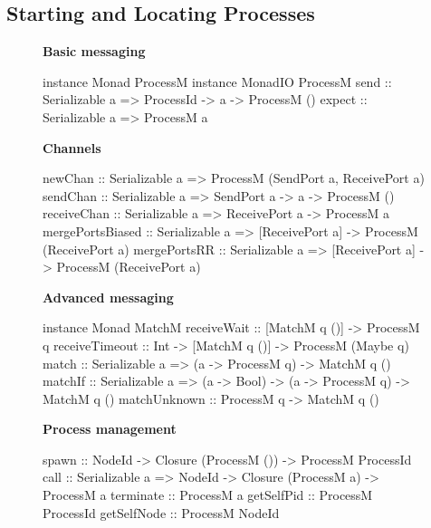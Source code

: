 \documentclass{sigplanconf}
\begin{document}

\subsection{Starting and Locating Processes}

\begin{figure}[t!]
\small
\renewcommand{\baselinestretch}{0.80}
\newcommand{\apisection}[1]{\textbf{#1} \vspace{-0.5ex}}
\apisection{Basic messaging}
\begin{code}
instance Monad ProcessM
instance MonadIO ProcessM
send   :: Serializable a => ProcessId -> a -> ProcessM ()
expect :: Serializable a => ProcessM a
\end{code}
 \apisection{Channels}
\begin{code}
newChan  :: Serializable a 
         => ProcessM (SendPort a, ReceivePort a)
sendChan :: Serializable a 
         => SendPort a -> a -> ProcessM ()
receiveChan :: Serializable a => ReceivePort a -> ProcessM a
mergePortsBiased :: Serializable a => [ReceivePort a]
                 -> ProcessM (ReceivePort a)
mergePortsRR :: Serializable a => [ReceivePort a] 
             -> ProcessM (ReceivePort a)
\end{code}

 \apisection{Advanced messaging}
\begin{code}
instance Monad MatchM
receiveWait    :: [MatchM q ()] -> ProcessM q
receiveTimeout :: Int -> [MatchM q ()] 
               -> ProcessM (Maybe q)
match :: Serializable a => (a -> ProcessM q) -> MatchM q ()
matchIf :: Serializable a => (a -> Bool) 
        -> (a -> ProcessM q) -> MatchM q ()
matchUnknown ::  ProcessM q -> MatchM q ()
\end{code}

 \apisection{Process management}
\begin{code}
spawn :: NodeId -> Closure (ProcessM ()) 
      -> ProcessM ProcessId
call :: Serializable a => NodeId -> 
        Closure (ProcessM a) -> ProcessM a
terminate :: ProcessM a
getSelfPid :: ProcessM ProcessId
getSelfNode :: ProcessM NodeId
\end{code}


\end{figure}
\end{document}
